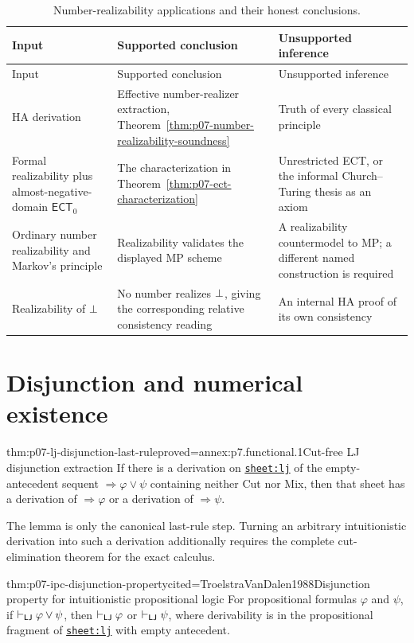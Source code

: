 \begingroup\small
\begin{longtable}{@{}p{}p{}p{}@{}}
\caption{Number-realizability applications and their honest conclusions.}
\label{tab:p07-realizability-applications}\\
\toprule
Input & Supported conclusion & Unsupported inference \\
\midrule
\endfirsthead
\toprule
Input & Supported conclusion & Unsupported inference \\
\midrule
\endhead
HA derivation & Effective number-realizer extraction,
Theorem~\ref{thm:p07-number-realizability-soundness} & Truth of every
classical principle \\
Formal realizability plus almost-negative-domain \(\mathsf{ECT}_0\) & The
characterization in Theorem~\ref{thm:p07-ect-characterization} & Unrestricted
ECT, or the informal Church--Turing thesis as an axiom \\
Ordinary number realizability and Markov's principle & Realizability validates
the displayed MP scheme & A realizability countermodel to MP; a different
named construction is required \\
Realizability of \(\bot\) & No number realizes \(\bot\), giving the
corresponding relative consistency reading & An internal HA proof of its own
consistency \\
\bottomrule
\end{longtable}
\endgroup

\section{Disjunction and numerical existence}
\label{sec:p07-constructive-properties}

\begin{hblemma}{thm:p07-lj-disjunction-last-rule}{proved=annex:p7.functional.1}{Cut-free LJ disjunction extraction}
If there is a derivation on
\hyperref[sheet:lj]{\texttt{sheet:lj}} of the empty-antecedent sequent
\(\Rightarrow\varphi\lor\psi\) containing neither Cut nor Mix, then that sheet
has a derivation of \(\Rightarrow\varphi\) or a derivation of
\(\Rightarrow\psi\).
\end{hblemma}

The lemma is only the canonical last-rule step.  Turning an arbitrary
intuitionistic derivation into such a derivation additionally requires the
complete cut-elimination theorem for the exact calculus.

\begin{hbtheorem}{thm:p07-ipc-disjunction-property}{cited=TroelstraVanDalen1988}{Disjunction property for intuitionistic propositional logic}
For propositional formulas \(\varphi\) and \(\psi\), if
\(\vdash_{\mathsf{LJ}}\varphi\lor\psi\), then
\(\vdash_{\mathsf{LJ}}\varphi\) or
\(\vdash_{\mathsf{LJ}}\psi\), where derivability is in the propositional
fragment of \hyperref[sheet:lj]{\texttt{sheet:lj}} with empty antecedent.
\end{hbtheorem}

